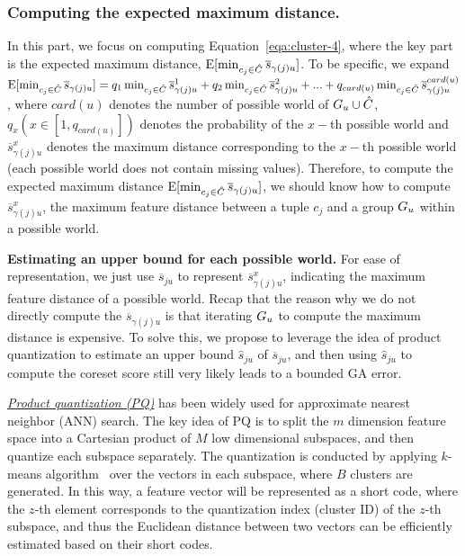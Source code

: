 \subsubsection{Computing the expected maximum distance.} In this part, we focus on computing Equation~\ref{eqa:cluster-4}, where the key part is the expected maximum distance, \ie $\mathrm{E}[\min_{c_j\in \hat{C}}\overline{s}_{\gamma(j)u}]$. To be specific, we expand $\mathrm{E}[\min_{c_j\in \hat{C}}\overline{s}_{\gamma(j)u}] = q_1\min_{c_j\in \hat{C}}\overline{s}_{\gamma(j)u}^1 + q_2\min_{c_j\in \hat{C}}\overline{s}_{\gamma(j)u}^2 + ... +q_{card(u)}\min_{c_j\in \hat{C}}\overline{s}_{\gamma(j)u}^{card(u)}$, where $card(u)$ denotes the number of possible world of $G_u \cup \hat{C}$, $q_x    (x\in [1, q_{card(u)}])$ denotes the probability of the $x-$th possible world and  $\overline{s}_{\gamma(j)u}^x$ denotes the maximum distance  corresponding to the $x-$th possible world (each possible world does not contain missing values). 
%
%
%
Therefore, to compute the expected maximum distance $\mathrm{E}[\min_{c_j\in \hat{C}}\overline{s}_{\gamma(j)u}]$, we should know how to compute $\overline{s}_{\gamma(j)u}^x$, \ie the  maximum feature distance between a tuple $c_j$ and a group $G_u$ within a possible world.

\noindent \textbf{Estimating an upper bound for each possible world.} 
For ease of representation, we just use $\overline{s}_{ju}$ to represent  $\overline{s}_{\gamma(j)u}^x$, indicating the maximum feature distance of a possible world.
%
%
 Recap that the reason why we do not directly compute the  $\overline{s}_{\gamma(j)u}$ is that iterating $G_u$ to compute the maximum distance is expensive.
  To solve this, we propose to leverage the idea of product quantization  to estimate an upper bound $\hat{s}_{ju}$ of $\overline{s}_{ju}$, and then using $\hat{s}_{ju}$ to compute the coreset score still very likely leads to a bounded GA error.
  
  \noindent  \underline{\textit{Product quantization (PQ)}}  has been widely used for approximate nearest neighbor (ANN) search.  The key idea of PQ is to split the $m$ dimension feature space into a Cartesian product of $M$ low dimensional subspaces, and then quantize each subspace separately.  
 The quantization is conducted by applying $k$-means algorithm~\cite{} over the vectors in each subspace, where $B$ clusters are generated.  
  In this way, a feature vector will be represented as a short code, where the $z$-th element corresponds to the quantization index (\ie cluster ID) of the $z$-th subspace, and thus the Euclidean distance between two vectors can be efficiently estimated based on their short codes. 
  

